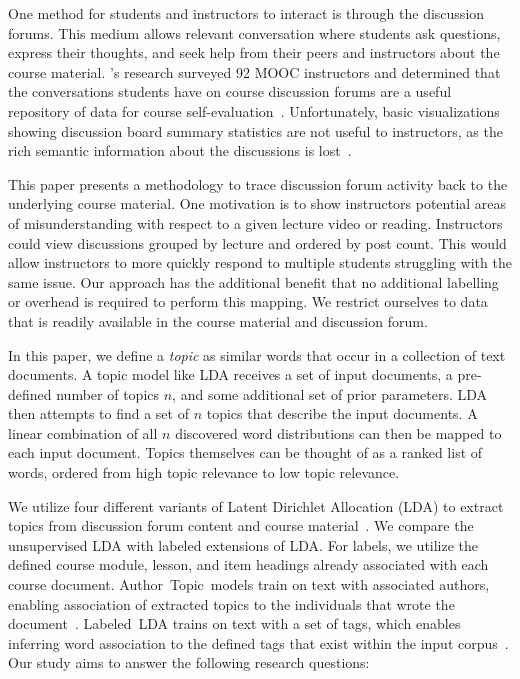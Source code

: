 \documentclass[sigconf, anonymous]{acmart}
\begin{document}
One method for students and instructors to interact is through the discussion forums.
This medium allows relevant conversation where students ask questions, express their thoughts, and seek help from their peers and instructors about the course material.
\citeauthor{stephens2014monitoring}'s research surveyed 92 MOOC instructors and determined that the conversations students have on course discussion forums are a useful repository of data for course self-evaluation~\cite{stephens2014monitoring}.
Unfortunately, basic visualizations showing discussion board summary statistics are not useful to instructors, as the rich semantic information about the discussions is lost~\cite{stephens2014monitoring}.

This paper presents a methodology to trace discussion forum activity back to the underlying course material.
One motivation is to show instructors potential areas of misunderstanding with respect to a given lecture video or reading.
Instructors could view discussions grouped by lecture and ordered by post count.
This would allow instructors to more quickly respond to multiple students struggling with the same issue.
Our approach has the additional benefit that no additional labelling or overhead is required to perform this mapping.
We restrict ourselves to data that is readily available in the course material and discussion forum.

In this paper, we define a \textit{topic} as similar words that occur in a collection of text documents.
A topic model like LDA receives a set of input documents, a pre-defined number of topics $n$, and some additional set of prior parameters.
LDA then attempts to find a set of $n$ topics that describe the input documents.
A linear combination of all $n$ discovered word distributions can then be mapped to each input document.
Topics themselves can be thought of as a ranked list of words, ordered from high topic relevance to low topic relevance.

We utilize four different variants of Latent Dirichlet Allocation (LDA) to extract topics from discussion forum content and course material~\cite{blei2003latent}.
We compare the unsupervised LDA with labeled extensions of LDA.
For labels, we utilize the defined course module, lesson, and item headings already associated with each course document.
Author~Topic~models train on text with associated authors, enabling association of extracted topics to the individuals that wrote the document~\cite{rosen2004author}.
Labeled~LDA trains on text with a set of tags, which enables inferring word association to the defined tags that exist within the input corpus~\cite{ramage2009labeled}.
Our study aims to answer the following research questions:
\end{document}
